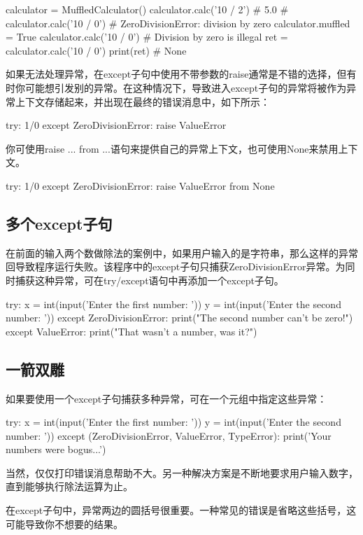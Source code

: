 \begin{pyc}
calculator = MuffledCalculator()
calculator.calc('10 / 2')  # 5.0
# calculator.calc('10 / 0')  # ZeroDivisionError: division by zero
calculator.muffled = True
calculator.calc('10 / 0')  # Division by zero is illegal
ret = calculator.calc('10 / 0')
print(ret)  # None
\end{pyc}

如果无法处理异常，在except子句中使用不带参数的raise通常是不错的选择，但有时你可能想引发别的异常。在这种情况下，导致进入except子句的异常将被作为异常上下文存储起来，并出现在最终的错误消息中，如下所示：
\begin{pyc}
try:
    1/0
except ZeroDivisionError:
    raise ValueError
\end{pyc}

你可使用raise ... from ...语句来提供自己的异常上下文，也可使用None来禁用上下文。
\begin{pyc}
try:
    1/0
except ZeroDivisionError:
    raise ValueError from None
\end{pyc}

\subsection{多个except子句}
在前面的输入两个数做除法的案例中，如果用户输入的是字符串，那么这样的异常回导致程序运行失败。该程序中的except子句只捕获ZeroDivisionError异常。为同时捕获这种异常，可在try/except语句中再添加一个except子句。
\begin{pyc}
try:
    x = int(input('Enter the first number: '))
    y = int(input('Enter the second number: '))
except ZeroDivisionError:
    print("The second number can't be zero!")
except ValueError:
    print("That wasn't a number, was it?")
\end{pyc}
\subsection{一箭双雕}
如果要使用一个except子句捕获多种异常，可在一个元组中指定这些异常：
\begin{pyc}
try:
    x = int(input('Enter the first number: '))
    y = int(input('Enter the second number: '))
except (ZeroDivisionError, ValueError, TypeError):
    print('Your numbers were bogus...')
\end{pyc}
当然，仅仅打印错误消息帮助不大。另一种解决方案是不断地要求用户输入数字，直到能够执行除法运算为止。

在except子句中，异常两边的圆括号很重要。一种常见的错误是省略这些括号，这可能导致你不想要的结果。
